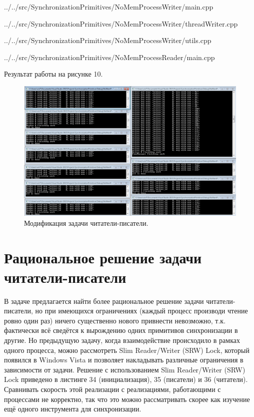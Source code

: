\documentclass[a4paper, 12pt]{article}		%
\begin{document}

{../../src/SynchronizationPrimitives/NoMemProcessWriter/main.cpp}


{../../src/SynchronizationPrimitives/NoMemProcessWriter/threadWriter.cpp}


{../../src/SynchronizationPrimitives/NoMemProcessWriter/utils.cpp}
\newpage


{../../src/SynchronizationPrimitives/NoMemProcessReader/main.cpp}
\newpage

Результат работы на рисунке 10.

\begin{figure}[h!]
\centering
\includegraphics[scale=0.50]{res/008}
\caption{Модификация задачи читатели-писатели.}
\end{figure}

\newpage
\section{Рациональное решение задачи читатели-писатели}

В задаче предлагается найти более рациональное решение задачи читатели-писатели, но при имеющихся ограничениях (каждый процесс производи чтение ровно один раз) ничего существенно нового привнести невозможно, т.к. фактически всё сведётся к вырождению одних примитивов синхронизации в другие. Но предыдущую задачу, когда взаимодействие происходило в рамках одного процесса, можно рассмотреть Slim Reader/Writer (SRW) Lock, который появился в Windows Vista и позволяет накладывать различные ограничения в зависимости от задачи.
Решение с использованием Slim Reader/Writer (SRW) Lock приведено в листинге 34 (инициализация), 35 (писатели) и 36 (читатели)\cite{MSDN2}. Сравнивать скорость этой реализации с реализациями, работающими с процессами не корректно, так что это можно рассматривать скорее как изучение ещё одного инструмента для синхронизации.
\end{document}
